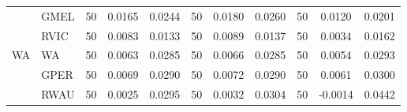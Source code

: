 \begin{table}[!hb]
{\begin{tabular}{llccccccccc}
          & GMEL  & 50    & 0.0165 & 0.0244 & 50    & 0.0180 & 0.0260 & 50    & 0.0120 & 0.0201 \\
          & RVIC  & 50    & 0.0083 & 0.0133 & 50    & 0.0089 & 0.0137 & 50    & 0.0034 & 0.0162 \\
    \multirow{3}[1]{*}{WA} & WA    & 50    & 0.0063 & 0.0285 & 50    & 0.0066 & 0.0285 & 50    & 0.0054 & 0.0293 \\
          & GPER  & 50    & 0.0069 & 0.0290 & 50    & 0.0072 & 0.0290 & 50    & 0.0061 & 0.0300 \\
          & RWAU  & 50    & 0.0025 & 0.0295 & 50    & 0.0032 & 0.0304 & 50    & -0.0014 & 0.0442 \\
    \bottomrule
    \end{tabular}%
  \label{tab:statistics_c_q}%
  }
\end{table}%
